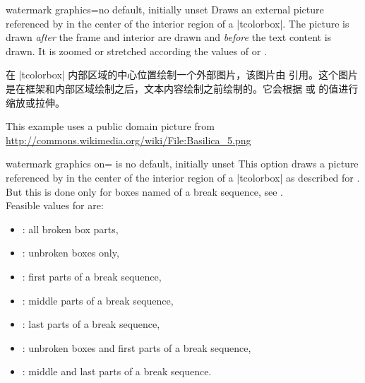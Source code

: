 

\begin{docTcbKey}{watermark graphics}{=}{no default, initially unset}
Draws an external picture referenced by 
in the center of the interior region of a |tcolorbox|.
The picture is drawn \emph{after} the
frame and interior are drawn and \emph{before} the text content is drawn.
It is zoomed or stretched according the values of
 or .

在 |tcolorbox| 内部区域的中心位置绘制一个外部图片，该图片由  引用。这个图片是在框架和内部区域绘制之后，文本内容绘制之前绘制的。它会根据  或  的值进行缩放或拉伸。
\begin{dispExample}

\begin{tcolorbox}[enhanced,title=My title,watermark graphics=Basilica_5.png,
watermark opacity=0.15]
\lipsum[1-2]
\tcblower
This example uses a public domain picture from\\
\url{http://commons.wikimedia.org/wiki/File:Basilica_5.png}
\end{tcolorbox}
\end{dispExample}
\end{docTcbKey}


\begin{docTcbKey}{watermark graphics on}{= is }{no default, initially unset}
This option draws a picture referenced by  in the center of the interior region of a |tcolorbox|
as described for .
But this is done only for boxes named  of a break sequence, see
.\\ 
Feasible values for  are:
\begin{itemize}
\item{}: all broken box parts,
\item{}: unbroken boxes only,
\item{}: first parts of a break sequence,
\item{}: middle parts of a break sequence,
\item{}: last parts of a break sequence,
\item{}: unbroken boxes and first parts of a break sequence,
\item{}: middle and last parts of a break sequence.
\end{itemize}
\end{docTcbKey}




